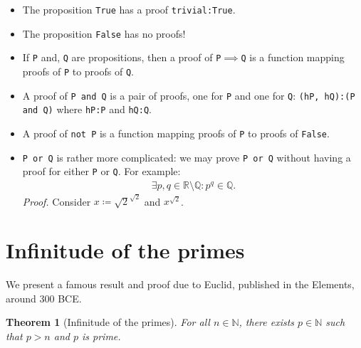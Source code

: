 \documentclass[12pt]{article}
\newtheorem*{theorem}{Theorem}
\newcommand{\N}{\mathbb{N}}
\begin{document}
\begin{itemize}
  \item The proposition \texttt{True} has a proof
    \texttt{trivial:True}.
  \item The proposition \texttt{False} has no proofs!
  \item If \texttt{P} and, \texttt{Q} are propositions,
    then a proof of \texttt{P}$\implies$\texttt{Q}
    is a function mapping proofs of \texttt{P}
    to proofs of \texttt{Q}.
  \item A proof of \texttt{P and Q} is a pair of proofs,
    one for \texttt{P} and one for \texttt{Q}:
    \texttt{(hP, hQ):(P and Q)} where
    \texttt{hP:P} and \texttt{hQ:Q}.
  \item A proof of \texttt{not P} is a function
    mapping proofs of \texttt{P} to proofs of \texttt{False}.
  \item \texttt{P or Q} is rather more complicated:
    we may prove \texttt{P or Q} without having a proof for either
    \texttt{P} or \texttt{Q}. For example:
    \begin{align*}
      \exists p, q \in \mathbb{R} \setminus \mathbb{Q}:
      p^q \in \mathbb{Q}.
    \end{align*}
    \emph{Proof.}
    Consider $x \coloneqq \sqrt{2}^{\sqrt{2}}$ and
    $x^{\sqrt 2}$.
\end{itemize}

\pagebreak

\section{Infinitude of the primes}

We present a famous result and proof due to Euclid,
published in the Elements, around 300 BCE.

\begin{theorem}[Infinitude of the primes]
  For all $n \in \N$,
  there exists $p \in \N$ such that
  $p > n$ and $p$ is prime.
\end{theorem}
\end{document}
